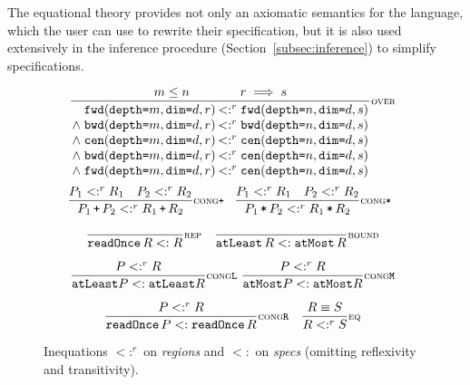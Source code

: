 \documentclass[9pt,preprint]{sigplanconf}
\theoremstyle{definition}
\newcommand{\term}[1]{\texttt{#1}}
\newcommand{\stenFwdSR}[3]{\term{fwd} (\term{depth=}#1,
  \term{dim=}#2, #3)}
\newcommand{\stenBwdSR}[3]{\term{bwd} (\term{depth=}#1,
  \term{dim=}#2, #3)}
\newcommand{\stenCenSR}[3]{\term{cen} (\term{depth=}#1,
  \term{dim=}#2, #3)}
\newcommand{\trule}[1]{{\footnotesize{#1}}}
\begin{document}
The equational theory provides not only an axiomatic semantics
for the language, which the user can use to rewrite their
specification, but it is also used extensively in the inference
procedure (Section~\ref{subsec:inference}) to simplify specifications.

\begin{figure}[t]
\begin{align*}
\hspace{-0.5em}
\begin{array}{c}
%
\vspace{-0.4em}
\setlength{\arraycolsep}{0.1em}
\dfrac{\hspace{3em} m \leq n \qquad\qquad r \implies s \hspace{3em}}
{\begin{array}{rl}
\stenFwdSR{m}{d}{r} & <:^r \stenFwdSR{n}{d}{s}
\\
\wedge \; \stenBwdSR{m}{d}{r} & <:^r \stenBwdSR{n}{d}{s}
\\
\wedge \; \stenCenSR{m}{d}{r} & <:^r \stenCenSR{n}{d}{s}
\\
\wedge \; \stenBwdSR{m}{d}{r} & <:^r \stenCenSR{n}{d}{s} \\
\wedge \; \stenFwdSR{m}{d}{r} & <:^r \stenCenSR{n}{d}{s} \\[1.2em]
\end{array}}\trule{\textsc{over}} \\[-0.2em]
\hspace{-0.5em}
\dfrac{P_1 <:^r R_1 \quad P_2 <:^r R_2}
      {P_1 \, \texttt{+} \, P_2 <:^r R_1 \, \texttt{+} \, R_2}
\trule{\textsc{cong}\texttt{+}} \;\;\;
\dfrac{P_1 <:^r R_1 \quad P_2 <:^r R_2}
      {P_1 \, \texttt{*} \, P_2 <:^r R_1 \, \texttt{*} \, R_2}
\trule{\textsc{cong}\texttt{*}} \\[1.5em]
%
\dfrac{}{\term{readOnce} \, R <: R}\trule{\textsc{rep}}
\quad
\dfrac{}{\term{atLeast} \, R <: \term{atMost} \,
  R}\trule{\textsc{bound}} \\[1.5em]
\dfrac{P <:^r R}{\term{atLeast}  P <: \term{atLeast} 
  R}\trule{\textsc{cong}\texttt{L}}
\ 
\dfrac{P <:^r R}{\term{atMost}  P <: \term{atMost} 
  R}\trule{\textsc{cong}\texttt{M}} \\[1.5em]
\dfrac{P <:^r R}{\term{readOnce} \, P <: \term{readOnce} \,
  R}\trule{\textsc{cong}\texttt{R}} 
\quad
\dfrac{R \equiv S}{R <:^r S}\trule{\textsc{eq}} 
\end{array}
\end{align*}
\caption{Inequations $<:^r$ on \textit{regions} and
$<:$ on \textit{specs} (omitting reflexivity
and transitivity). }
\label{fig:inequations}
\vspace{-0.8em}
\end{figure}
\end{document}
